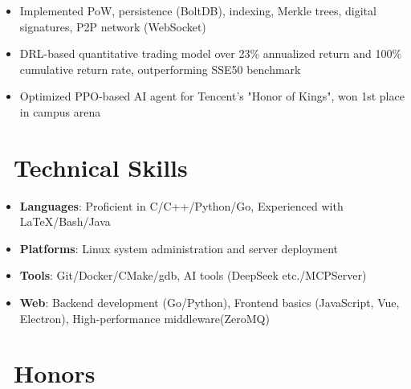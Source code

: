\documentclass{resume}
\begin{document}
\begin{itemize}
    \item Implemented PoW, persistence (BoltDB), indexing, Merkle trees, digital signatures, P2P network (WebSocket)
\end{itemize}

\begin{itemize}[parsep=0.5ex] 
    \item DRL-based quantitative trading model over 23\% annualized return and 100\% cumulative return rate, outperforming SSE50 benchmark
    \item Optimized PPO-based AI agent for Tencent's "Honor of Kings", won 1st place in campus arena
\end{itemize}

\section{\faCogs\ Technical Skills}
\begin{itemize}
    \item \textbf{Languages}: Proficient in C/C++/Python/Go, Experienced with LaTeX/Bash/Java
    \item \textbf{Platforms}: Linux system administration and server deployment
    \item \textbf{Tools}: Git/Docker/CMake/gdb, AI tools (DeepSeek etc./MCPServer)
    \item \textbf{Web}: Backend development (Go/Python), Frontend basics (JavaScript, Vue, Electron), High-performance middleware(ZeroMQ)
\end{itemize}

\section{\faTrophy\ Honors}
\end{document}
